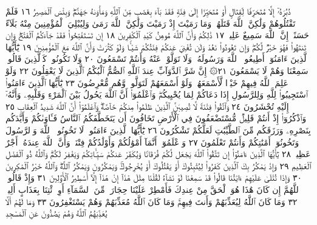 دُبُرَهُۥٓ إِلَّا مُتَحَرِّفࣰا لِّقِتَالٍ أَوْ مُتَحَيِّزًا إِلَىٰ فِئَةࣲ فَقَدْ بَآءَ
بِغَضَبࣲ مِّنَ ٱللَّهِ وَمَأْوَىٰهُ جَهَنَّمُۖ وَبِئْسَ ٱلْمَصِيرُ ١٦
فَلَمْ تَقْتُلُوهُمْ وَلَٰكِنَّ ٱللَّهَ قَتَلَهُمْۚ وَمَا رَمَيْتَ إِذْ رَمَيْتَ
وَلَٰكِنَّ ٱللَّهَ رَمَىٰ وَلِيُبْلِيَ ٱلْمُؤْمِنِينَ مِنْهُ بَلَآءً حَسَنًاۚ
إِنَّ ٱللَّهَ سَمِيعٌ عَلِيمࣱ ١٧ ذَٰلِكُمْ وَأَنَّ ٱللَّهَ مُوهِنُ كَيْدِ
ٱلْكَٰفِرِينَ ١٨ إِن تَسْتَفْتِحُوا۟ فَقَدْ جَآءَكُمُ ٱلْفَتْحُۖ وَإِن
تَنتَهُوا۟ فَهُوَ خَيْرࣱ لَّكُمْۖ وَإِن تَعُودُوا۟ نَعُدْ وَلَن تُغْنِيَ عَنكُمْ
فِئَتُكُمْ شَيْـࣰٔا وَلَوْ كَثُرَتْ وَأَنَّ ٱللَّهَ مَعَ ٱلْمُؤْمِنِينَ ١٩
يَٰٓأَيُّهَا ٱلَّذِينَ ءَامَنُوٓا۟ أَطِيعُوا۟ ٱللَّهَ وَرَسُولَهُۥ وَلَا تَوَلَّوْا۟ عَنْهُ
وَأَنتُمْ تَسْمَعُونَ ٢٠ وَلَا تَكُونُوا۟ كَٱلَّذِينَ قَالُوا۟ سَمِعْنَا وَهُمْ
لَا يَسْمَعُونَ ٢١۞ إِنَّ شَرَّ ٱلدَّوَآبِّ عِندَ ٱللَّهِ ٱلصُّمُّ ٱلْبُكْمُ
ٱلَّذِينَ لَا يَعْقِلُونَ ٢٢ وَلَوْ عَلِمَ ٱللَّهُ فِيهِمْ خَيْرࣰا لَّأَسْمَعَهُمْۖ
وَلَوْ أَسْمَعَهُمْ لَتَوَلَّوا۟ وَّهُم مُّعْرِضُونَ ٢٣ يَٰٓأَيُّهَا ٱلَّذِينَ
ءَامَنُوا۟ ٱسْتَجِيبُوا۟ لِلَّهِ وَلِلرَّسُولِ إِذَا دَعَاكُمْ لِمَا يُحْيِيكُمْۖ
وَٱعْلَمُوٓا۟ أَنَّ ٱللَّهَ يَحُولُ بَيْنَ ٱلْمَرْءِ وَقَلْبِهِۦ وَأَنَّهُۥٓ إِلَيْهِ
تُحْشَرُونَ ٢٤ وَٱتَّقُوا۟ فِتْنَةࣰ لَّا تُصِيبَنَّ ٱلَّذِينَ ظَلَمُوا۟
مِنكُمْ خَآصَّةࣰۖ وَٱعْلَمُوٓا۟ أَنَّ ٱللَّهَ شَدِيدُ ٱلْعِقَابِ ٢٥
وَٱذْكُرُوٓا۟ إِذْ أَنتُمْ قَلِيلࣱ مُّسْتَضْعَفُونَ فِي ٱلْأَرْضِ تَخَافُونَ
أَن يَتَخَطَّفَكُمُ ٱلنَّاسُ فَـَٔاوَىٰكُمْ وَأَيَّدَكُم بِنَصْرِهِۦ وَرَزَقَكُم
مِّنَ ٱلطَّيِّبَٰتِ لَعَلَّكُمْ تَشْكُرُونَ ٢٦ يَٰٓأَيُّهَا ٱلَّذِينَ ءَامَنُوا۟
لَا تَخُونُوا۟ ٱللَّهَ وَٱلرَّسُولَ وَتَخُونُوٓا۟ أَمَٰنَٰتِكُمْ وَأَنتُمْ تَعْلَمُونَ ٢٧
وَٱعْلَمُوٓا۟ أَنَّمَآ أَمْوَٰلُكُمْ وَأَوْلَٰدُكُمْ فِتْنَةࣱ وَأَنَّ ٱللَّهَ
عِندَهُۥٓ أَجْرٌ عَظِيمࣱ ٢٨ يَٰٓأَيُّهَا ٱلَّذِينَ ءَامَنُوٓا۟ إِن تَتَّقُوا۟
ٱللَّهَ يَجْعَل لَّكُمْ فُرْقَانࣰا وَيُكَفِّرْ عَنكُمْ سَيِّـَٔاتِكُمْ
وَيَغْفِرْ لَكُمْۗ وَٱللَّهُ ذُو ٱلْفَضْلِ ٱلْعَظِيمِ ٢٩ وَإِذْ يَمْكُرُ بِكَ
ٱلَّذِينَ كَفَرُوا۟ لِيُثْبِتُوكَ أَوْ يَقْتُلُوكَ أَوْ يُخْرِجُوكَۚ وَيَمْكُرُونَ
وَيَمْكُرُ ٱللَّهُۖ وَٱللَّهُ خَيْرُ ٱلْمَٰكِرِينَ ٣٠ وَإِذَا تُتْلَىٰ عَلَيْهِمْ
ءَايَٰتُنَا قَالُوا۟ قَدْ سَمِعْنَا لَوْ نَشَآءُ لَقُلْنَا مِثْلَ هَٰذَآ إِنْ هَٰذَآ
إِلَّآ أَسَٰطِيرُ ٱلْأَوَّلِينَ ٣١ وَإِذْ قَالُوا۟ ٱللَّهُمَّ إِن كَانَ هَٰذَا
هُوَ ٱلْحَقَّ مِنْ عِندِكَ فَأَمْطِرْ عَلَيْنَا حِجَارَةࣰ مِّنَ ٱلسَّمَآءِ
أَوِ ٱئْتِنَا بِعَذَابٍ أَلِيمࣲ ٣٢ وَمَا كَانَ ٱللَّهُ لِيُعَذِّبَهُمْ وَأَنتَ
فِيهِمْۚ وَمَا كَانَ ٱللَّهُ مُعَذِّبَهُمْ وَهُمْ يَسْتَغْفِرُونَ ٣٣
وَمَا لَهُمْ أَلَّا يُعَذِّبَهُمُ ٱللَّهُ وَهُمْ يَصُدُّونَ عَنِ ٱلْمَسْجِدِ
